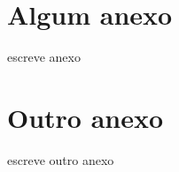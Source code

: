 \begin{anexosenv}

    \partanexos

    \chapter{Algum anexo}

    escreve anexo

    \chapter{Outro anexo}

    escreve outro anexo

\end{anexosenv}
